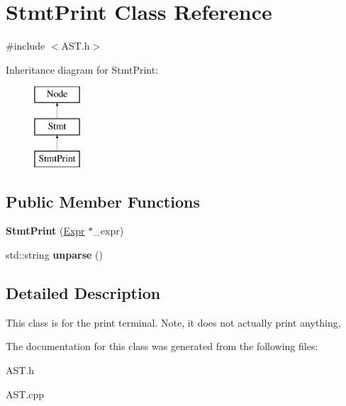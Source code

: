 \hypertarget{classStmtPrint}{\section{Stmt\-Print Class Reference}
\label{classStmtPrint}
}


{\ttfamily \#include $<$A\-S\-T.\-h$>$}

Inheritance diagram for Stmt\-Print\-:\begin{figure}[H]
\begin{center}
\leavevmode
\includegraphics[height=3.000000cm]{classStmtPrint}
\end{center}
\end{figure}
\subsection*{Public Member Functions}
\begin{DoxyCompactItemize}
\item 
\hypertarget{classStmtPrint_a9ca7ffa218050c250cdce704bcaf1c89}{{\bfseries Stmt\-Print} (\hyperlink{classExpr}{Expr} $\ast$\-\_\-expr)}\label{classStmtPrint_a9ca7ffa218050c250cdce704bcaf1c89}

\item 
\hypertarget{classStmtPrint_adf9cf968194ef383115d2043f5bba6a3}{std\-::string {\bfseries unparse} ()}\label{classStmtPrint_adf9cf968194ef383115d2043f5bba6a3}

\end{DoxyCompactItemize}


\subsection{Detailed Description}
This class is for the print terminal. Note, it does not actually print anything, 

The documentation for this class was generated from the following files\-:\begin{DoxyCompactItemize}
\item 
A\-S\-T.\-h\item 
A\-S\-T.\-cpp\end{DoxyCompactItemize}
